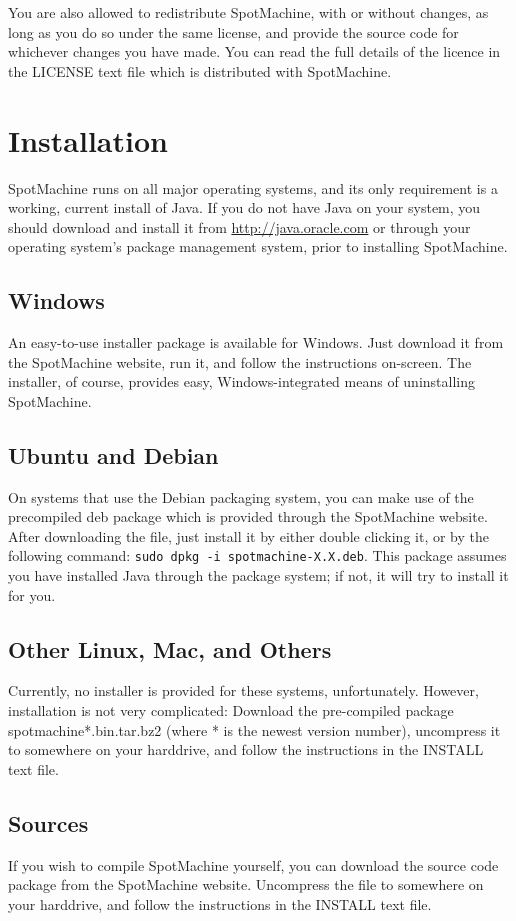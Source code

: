 \documentclass[a4paper,12pt]{report}
\begin{document}
You are also allowed to redistribute SpotMachine, with or without changes, as
long as you do so under the same license, and provide the source code for
whichever changes you have made. You can read the full details of the licence in
the LICENSE text file which is distributed with SpotMachine.

\chapter{Installation}
SpotMachine runs on all major operating systems, and its only requirement is a
working, current install of Java. If you do not have Java on your system, you
should download and install it from \url{http://java.oracle.com} or through your
operating system's package management system, prior to installing SpotMachine.

\section{Windows}
An easy-to-use installer package is available for Windows. Just download it from
the SpotMachine website, run it, and follow the instructions on-screen. The
installer, of course, provides easy, Windows-integrated means of uninstalling
SpotMachine.

\section{Ubuntu and Debian}
On systems that use the Debian packaging system, you can make use of the
precompiled deb package which is provided through the SpotMachine website. After
downloading the file, just install it by either double clicking it, or by the
following command: \texttt{sudo dpkg -i spotmachine-X.X.deb}. This package
assumes you have installed Java through the package system; if not, it will try
to install it for you.

\section{Other Linux, Mac, and Others}
Currently, no installer is provided for these systems, unfortunately. However,
installation is not very complicated: Download the pre-compiled package
spotmachine*.bin.tar.bz2 (where * is the newest version number), uncompress it
to somewhere on your harddrive, and follow the instructions in the INSTALL text
file.

\section{Sources}
If you wish to compile SpotMachine yourself, you can download the source code
package from the SpotMachine website. Uncompress the file to somewhere on your
harddrive, and follow the instructions in the INSTALL text file.
\end{document}
